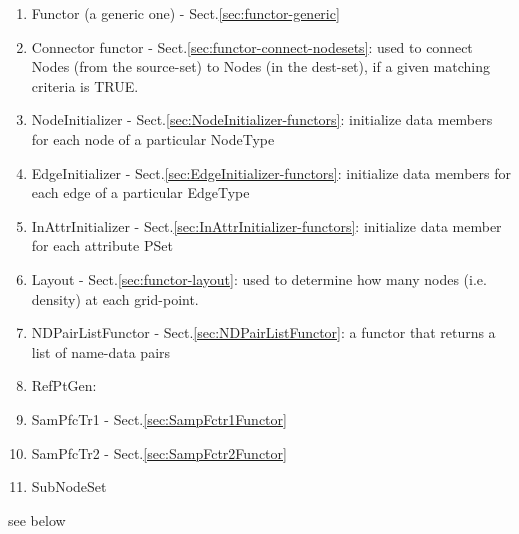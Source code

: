 \begin{enumerate}
  \item Functor (a generic one) - Sect.\ref{sec:functor-generic}

  \item Connector functor - Sect.\ref{sec:functor-connect-nodesets}: used to
  connect Nodes (from the source-set) to Nodes (in the dest-set), if a given
  matching criteria is TRUE.
  
  \item NodeInitializer -  Sect.\ref{sec:NodeInitializer-functors}: initialize
  data members for each node of a particular NodeType
  
  \item EdgeInitializer - Sect.\ref{sec:EdgeInitializer-functors}: initialize 
  data members for each edge of a particular EdgeType
  
  \item InAttrInitializer - Sect.\ref{sec:InAttrInitializer-functors}:
  initialize data member for each attribute PSet

  \item Layout - Sect.\ref{sec:functor-layout}: used to determine how many nodes
  (i.e. density) at each grid-point.
  
  \item NDPairListFunctor - Sect.\ref{sec:NDPairListFunctor}: a functor that
  returns a list of name-data pairs
  
  \item RefPtGen: 
  
  \item SamPfcTr1 - Sect.\ref{sec:SampFctr1Functor}
  
  \item SamPfcTr2 - Sect.\ref{sec:SampFctr2Functor}
  
  \item SubNodeSet
\end{enumerate}
see below

